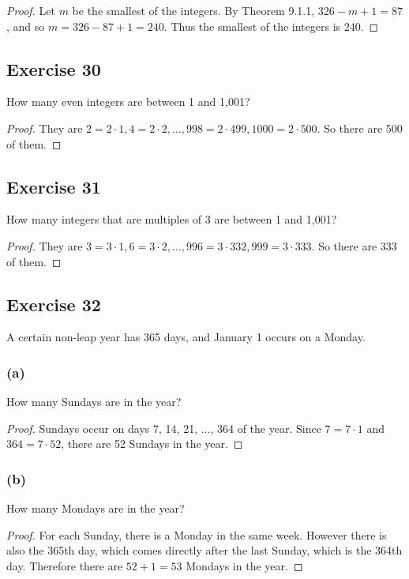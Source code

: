 \documentclass[14pt]{extarticle}
\begin{document}
\begin{proof}
Let $m$ be the smallest of the integers. By Theorem 9.1.1, \(326 - m + 1 = 87\), and so \(m = 326 - 87 + 1 = 240\). 
Thus the smallest of the integers is 240.
\end{proof}

\subsection{Exercise 30}
How many even integers are between 1 and 1,001?

\begin{proof}
They are \(2 = 2 \cdot 1, 4 = 2 \cdot 2, \ldots, 998 = 2 \cdot 499, 1000 = 2 \cdot 500\). So there are 500 of them.
\end{proof}

\subsection{Exercise 31}
How many integers that are multiples of 3 are between 1 and 1,001?

\begin{proof}
They are \(3 = 3 \cdot 1, 6 = 3 \cdot 2, \ldots, 996 = 3 \cdot 332, 999 = 3 \cdot 333\). So there are 333 of them.
\end{proof}

\subsection{Exercise 32}
A certain non-leap year has 365 days, and January 1 occurs on a Monday.

\subsubsection{(a)}
How many Sundays are in the year?

\begin{proof}
Sundays occur on days 7, 14, 21, \(\ldots\), 364 of the year. Since \(7 = 7 \cdot 1\) and \(364 = 7 \cdot 52\),
there are 52 Sundays in the year.
\end{proof}

\subsubsection{(b)}
How many Mondays are in the year?

\begin{proof}
For each Sunday, there is a Monday in the same week. However there is also the 365th day, which comes directly
after the last Sunday, which is the 364th day. Therefore there are \(52 + 1 = 53\) Mondays in the year.
\end{proof}
\end{document}
